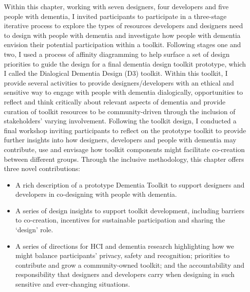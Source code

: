 Within this chapter, working with seven designers, four developers and five people with dementia, I invited participants to participate in a three-stage iterative process to explore the types of resources developers and designers need to design with people with dementia and investigate how people with dementia envision their potential participation within a toolkit. Following stages one and two, I used a process of affinity diagramming to help surface a set of design priorities to guide the design for a final dementia design toolkit prototype, which I called the Dialogical Dementia Design (D3) toolkit. Within this toolkit, I provide several activities to provide designers/developers with an ethical and sensitive way to engage with people with dementia dialogically, opportunities to reflect and think critically about relevant aspects of dementia and provide curation of toolkit resources to be community-driven through the inclusion of stakeholders' varying involvement. Following the toolkit design, I conducted a final workshop inviting participants to reflect on the prototype toolkit to provide further insights into how designers, developers and people with dementia may contribute, use and envisage how toolkit components might facilitate co-creation between different groups. Through the inclusive methodology, this chapter offers three novel contributions:

\begin{itemize}
    \item  A rich description of a prototype Dementia Toolkit to support designers and developers in co-designing with people with dementia.
    \item  A series of design insights to support toolkit development, including barriers to co-creation, incentives for sustainable participation and sharing the `design' role.
    \item A series of directions for HCI and dementia research highlighting how we might balance participants' privacy, safety and recognition; priorities to contribute and grow a community-owned toolkit; and the accountability and responsibility that designers and developers carry when designing in such sensitive and ever-changing situations.
\end{itemize}


